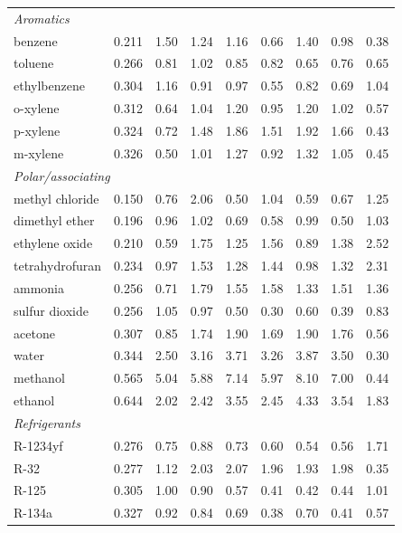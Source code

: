 \begin{table}[H]
\begin{tabular}{lcccccccc}
\multicolumn{9}{l}{\emph{Aromatics}} \\
benzene & 0.211 & 1.50 & 1.24 & 1.16 & 0.66 & 1.40 & 0.98 & 0.38 \\
toluene & 0.266 & 0.81 & 1.02 & 0.85 & 0.82 & 0.65 & 0.76 & 0.65 \\
ethylbenzene & 0.304 & 1.16 & 0.91 & 0.97 & 0.55 & 0.82 & 0.69 & 1.04 \\
o-xylene & 0.312 & 0.64 & 1.04 & 1.20 & 0.95 & 1.20 & 1.02 & 0.57 \\
p-xylene & 0.324 & 0.72 & 1.48 & 1.86 & 1.51 & 1.92 & 1.66 & 0.43 \\
m-xylene & 0.326 & 0.50 & 1.01 & 1.27 & 0.92 & 1.32 & 1.05 & 0.45 \\
\multicolumn{9}{l}{\emph{Polar/associating}} \\
methyl chloride & 0.150 & 0.76 & 2.06 & 0.50 & 1.04 & 0.59 & 0.67 & 1.25 \\
dimethyl ether & 0.196 & 0.96 & 1.02 & 0.69 & 0.58 & 0.99 & 0.50 & 1.03 \\
ethylene oxide & 0.210 & 0.59 & 1.75 & 1.25 & 1.56 & 0.89 & 1.38 & 2.52 \\
tetrahydrofuran & 0.234 & 0.97 & 1.53 & 1.28 & 1.44 & 0.98 & 1.32 & 2.31 \\
ammonia & 0.256 & 0.71 & 1.79 & 1.55 & 1.58 & 1.33 & 1.51 & 1.36 \\
sulfur dioxide & 0.256 & 1.05 & 0.97 & 0.50 & 0.30 & 0.60 & 0.39 & 0.83 \\
acetone & 0.307 & 0.85 & 1.74 & 1.90 & 1.69 & 1.90 & 1.76 & 0.56 \\
water & 0.344 & 2.50 & 3.16 & 3.71 & 3.26 & 3.87 & 3.50 & 0.30 \\
methanol & 0.565 & 5.04 & 5.88 & 7.14 & 5.97 & 8.10 & 7.00 & 0.44 \\
ethanol & 0.644 & 2.02 & 2.42 & 3.55 & 2.45 & 4.33 & 3.54 & 1.83 \\
\multicolumn{9}{l}{\emph{Refrigerants}} \\
R-1234yf & 0.276 & 0.75 & 0.88 & 0.73 & 0.60 & 0.54 & 0.56 & 1.71 \\
R-32 & 0.277 & 1.12 & 2.03 & 2.07 & 1.96 & 1.93 & 1.98 & 0.35 \\
R-125 & 0.305 & 1.00 & 0.90 & 0.57 & 0.41 & 0.42 & 0.44 & 1.01 \\
R-134a & 0.327 & 0.92 & 0.84 & 0.69 & 0.38 & 0.70 & 0.41 & 0.57 \\
\bottomrule
\end{tabular}
\end{table}
